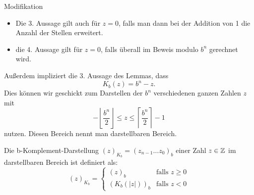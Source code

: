 \begin{remark} Modifikation 
\begin{itemize}
	\item Die 3. Aussage gilt auch für $z=0$, falls man dann bei der Addition von 1 die Anzahl der Stellen erweitert.
	\item die 4. Aussage gilt für $z=0$, falls überall im Beweis modulo $b^{n}$ gerechnet wird.
\end{itemize}
\end{remark}
Außerdem impliziert die 3. Aussage des Lemmas, dass 
\begin{equation}
	K_b(z)=b^{n}-z \text{.}
\end{equation}
Dies können wir geschickt zum Darstellen der $b^{n}$ verschiedenen ganzen Zahlen $z$ mit 
\[
-\left\lfloor \frac{b^{n}}{2}\right\rfloor \le z \le \left\lceil \frac{b^{n}}{2}\right\rceil -1
\]
nutzen. Diesen Bereich nennt man darstellbaren Bereich.
\begin{definition}
	Die b-Komplement-Darstellung $(z)_{K_b} = (z_{n-1} \ldots z_0)_b$ einer Zahl $z \in  \mathbb{Z}$ im darstellbaren Bereich ist definiert als:
	\[
		(z)_{K_b}= \begin{cases}
			(z)_b & \text{falls } z \ge 0 \\
			\left( K_b(|z|) \right)_b & \text{falls } z<0
		\end{cases}
	\]
\end{definition}


